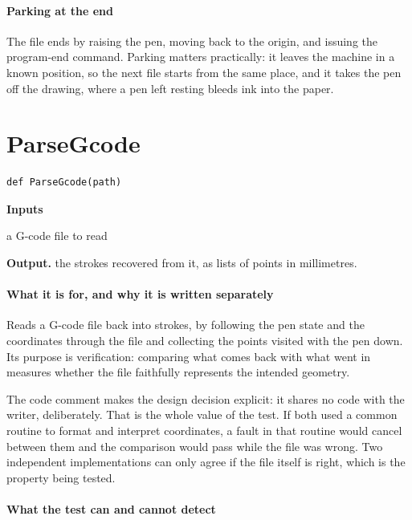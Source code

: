 \paragraph{Parking at the end}
The file ends by raising the pen, moving back to the origin, and issuing the program-end command. Parking matters practically: it leaves the machine in a known position, so the next file starts from the same place, and it takes the pen off the drawing, where a pen left resting bleeds ink into the paper.


\section{ParseGcode}
\begin{lstlisting}[style=sig]
def ParseGcode(path)
\end{lstlisting}

\noindent\textbf{Inputs}
\begin{description}[leftmargin=2.2em,style=nextline,font=\normalfont\ttfamily]\setlength\itemsep{1pt}
  \item[{path}] \normalfont a G-code file to read
\end{description}

\noindent\textbf{Output.} the strokes recovered from it, as lists of points in millimetres.


\paragraph{What it is for, and why it is written separately}
Reads a G-code file back into strokes, by following the pen state and the coordinates through the file and collecting the points visited with the pen down. Its purpose is verification: comparing what comes back with what went in measures whether the file faithfully represents the intended geometry.

The code comment makes the design decision explicit: it shares no code with the writer, deliberately. That is the whole value of the test. If both used a common routine to format and interpret coordinates, a fault in that routine would cancel between them and the comparison would pass while the file was wrong. Two independent implementations can only agree if the file itself is right, which is the property being tested.


\paragraph{What the test can and cannot detect}

